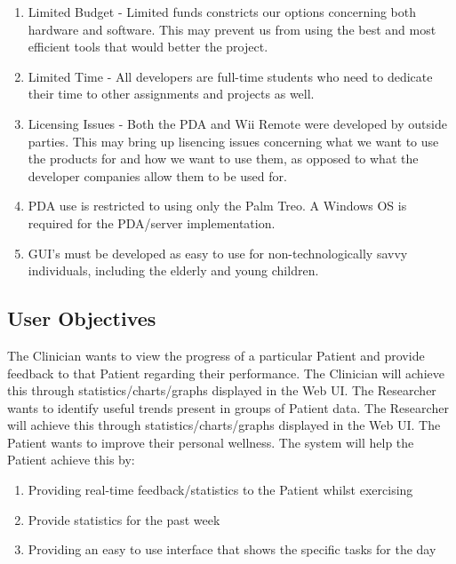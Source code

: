 \documentclass{article}
\begin{document}
\begin{enumerate}

\item Limited Budget - Limited funds constricts our options concerning both hardware and software. This may prevent us from using the best and most efficient tools that would better the project.

\item Limited Time - All developers are full-time students who need to dedicate their time to other assignments and projects as well.

\item Licensing Issues - Both the PDA and Wii Remote were developed by outside parties. This may bring up lisencing issues concerning what we want to use the products for and how we want to use them, as opposed to what the developer companies allow them to be used for.

\item PDA use is restricted to using only the Palm Treo. A Windows OS is required for the PDA/server implementation.

\item GUI's must be developed as easy to use for non-technologically savvy individuals, including the elderly and young children.

\end{enumerate}


\subsection {User Objectives}

The Clinician wants to view the progress of a particular Patient and provide feedback to that Patient regarding their performance. The Clinician will achieve this through statistics/charts/graphs displayed in the Web UI. 
The Researcher wants to identify useful trends present in groups of Patient data. The Researcher will achieve this through statistics/charts/graphs displayed in the Web UI. 
The Patient wants to improve their personal wellness. The system will help the Patient achieve this by:
\begin{enumerate}
\item Providing real-time feedback/statistics to the Patient whilst exercising
\item Provide statistics for the past week
\item Providing an easy to use interface that shows the specific tasks for the day
\end{enumerate}
\end{document}
